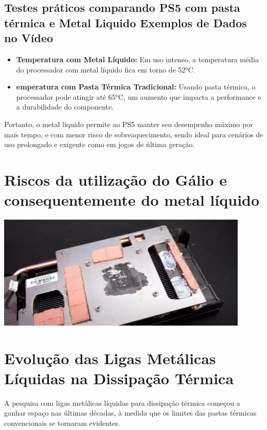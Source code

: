 \documentclass[12pt]{article}
\begin{document}
\subsection{Testes práticos comparando PS5 com pasta térmica e Metal Liquido
Exemplos de Dados no Vídeo}
\begin{itemize}
    \item \textbf{Temperatura com Metal Líquido: } Em uso intenso, a temperatura média do processador com metal líquido fica em torno de 52°C.
    \item \textbf{emperatura com Pasta Térmica Tradicional: } Usando pasta térmica, o processador pode atingir até 65°C, um aumento que impacta a performance e a durabilidade do componente.
\end{itemize}
Portanto, o metal líquido permite ao PS5 manter seu desempenho máximo por mais tempo, e com menor risco de sobreaquecimento, sendo ideal para cenários de uso prolongado e exigente como em jogos de última geração.
\section{Riscos da utilização do Gálio e consequentemente do metal líquido}
\begin{adjustbox}{center,caption={Dissipador de calor que utiliza metal liquido},nofloat=figure,vspace=\bigskipamount}
    \centering
    \includegraphics[width=12cm]{heatspreader.png}
\end{adjustbox}
\section{Evolução das Ligas Metálicas Líquidas na Dissipação Térmica}
A pesquisa com ligas metálicas líquidas para dissipação térmica começou a ganhar espaço nas últimas décadas, à medida que os limites das pastas térmicas convencionais se tornaram evidentes. 
\end{document}
